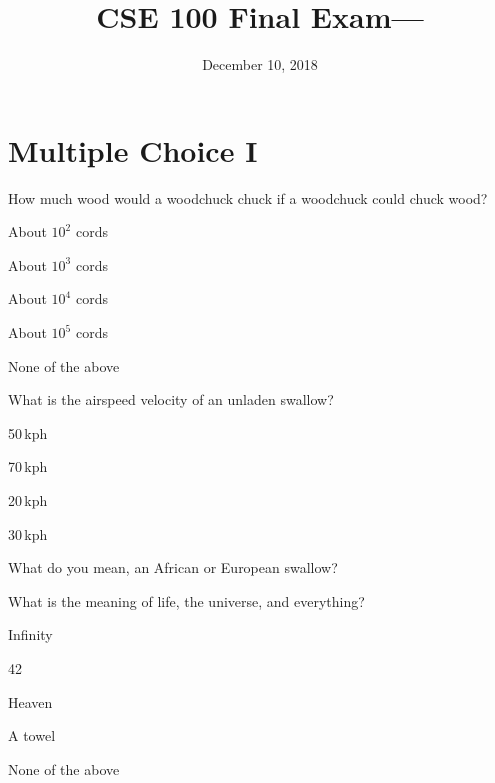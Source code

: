 \documentclass[11pt,nochoiceboxes,solutions,internaltesting]{exam3}
\begin{document}
\title{CSE 100 Final Exam---\fbox{\textbf{\examversionname}}}
\date{December 10, 2018}
\maketitle

\thispagestyle{fancy}
\setlength{\partopsep}{0pt}

\section*{Multiple Choice I}

\begin{problem}{2}
  How much wood would a woodchuck chuck if a woodchuck could chuck wood?
  \begin{multichoice}
    \item *About $10^2$ cords
    \item *About $10^3$ cords
    \item About $10^4$ cords
    \item About $10^5$ cords
    \item None of the above
  \end{multichoice}
\end{problem}

%
%
\begin{problem}{2}
  What is the airspeed velocity of an unladen swallow?
  \begin{multichoice}[order=badce]
    \item 50\,kph
    \item 70\,kph
    \item 20\,kph
    \item 30\,kph
    \item *What do you mean, an African or European swallow?
  \end{multichoice}
\end{problem}

%
%
\begin{problem}{2}
  What is the meaning of life, the universe, and everything?
  \begin{multichoice}[set=E]
    \item Infinity
    \item *42
    \item Heaven
    \item A towel
    \item None of the above
  \end{multichoice}
\end{problem}
\end{document}
